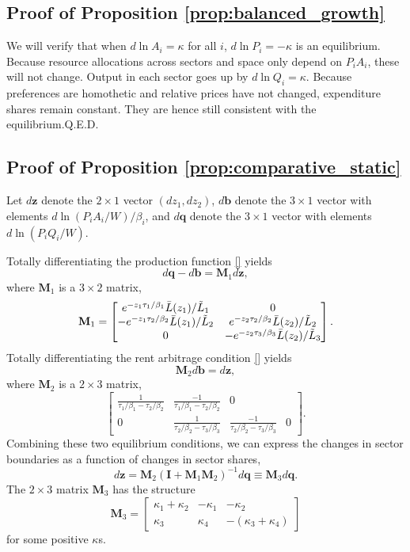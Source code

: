 \documentclass[12pt]{article}
\begin{document}
\subsection{Proof of Proposition \ref{prop:balanced_growth}}
We will verify that when $d\ln A_i=\kappa$ for all $i$, $d\ln P_i=-\kappa$ is an equilibrium. Because resource allocations across sectors and space only depend on $P_iA_i$, these will not change. Output in each sector goes up by $d\ln Q_i = \kappa$. Because preferences are homothetic and relative prices have not changed, expenditure shares remain constant. They are hence still consistent with the equilibrium.\hfill Q.E.D.

\subsection{Proof of Proposition \ref{prop:comparative_static}}
Let $d\mathbf z$ denote the $2\times1$ vector $(dz_1,dz_2)$, $d\mathbf b$ denote the $3\times1$ vector with elements $d\ln(P_iA_i/W)/\beta_i$, and $d\mathbf q$ denote the $3\times1$ vector with elements $d\ln(P_iQ_i/W)$.

Totally differentiating the production function \eqref{} yields
\[
d\mathbf q - d\mathbf b = \mathbf M_1 d\mathbf z,
\]
where $\mathbf M_1$ is a $3\times2$ matrix,
\[
\mathbf M_1 =
\begin{bmatrix}
	e^{-z_1\tau_1/\beta_1}\Bar L(z_1)/\tilde L_1 & 0\\
	-e^{-z_1\tau_2/\beta_2}\Bar L(z_1)/\tilde L_2 & 
		e^{-z_2\tau_2/\beta_2}\Bar L(z_2)/\tilde L_2\\
	0 & -e^{-z_2\tau_3/\beta_3}\Bar L(z_2)/\tilde L_3 
\end{bmatrix}.
\]
Totally differentiating the rent arbitrage condition \eqref{} yields
\[
\mathbf M_2 d\mathbf b = d\mathbf z, 
\]
where $\mathbf M_2$ is a $2\times3$ matrix,
\[
\begin{bmatrix}
	\frac 1
		{\tau_1/\beta_1 - \tau_2/\beta_2}
	& 	\frac {-1}
		{\tau_1/\beta_1 - \tau_2/\beta_2}
	& 0 \\
	0
	& \frac 1
		{\tau_2/\beta_2 - \tau_3/\beta_3}
	& 	\frac {-1}
		{\tau_2/\beta_2 - \tau_3/\beta_3}
	& 0 
\end{bmatrix}.
\]
Combining these two equilibrium conditions, we can express the changes in sector boundaries as a function of changes in sector shares,
\[
d\mathbf z = \mathbf M_2 (\mathbf I+\mathbf M_1\mathbf M_2)^{-1}d\mathbf q \equiv \mathbf M_3 d\mathbf q.
\]
The $2\times3$ matrix $\mathbf M_3$ has the structure
\[
\mathbf M_3 =
\begin{bmatrix}
\kappa_1+\kappa_2 	& -\kappa_1 	& -\kappa_2 \\
\kappa_3 			& \kappa_4		& -(\kappa_3+\kappa_4)
\end{bmatrix}
\]
for some positive $\kappa$s. 
\end{document}
